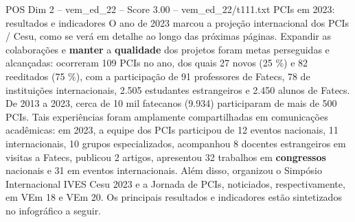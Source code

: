 \begin{textsample}{POS Dim 2 – vem\_ed\_22 – Score 3.00 – vem\_ed\_22/t111.txt}  \label{ex:f2_pos_179}
PCIs em 2023: resultados e indicadores O ano de 2023 marcou a projeção internacional dos PCIs / Cesu, como se verá em detalhe ao longo das próximas páginas.
Expandir as colaborações e \textbf{manter} a \textbf{qualidade} dos projetos foram metas perseguidas e alcançadas: ocorreram 109 PCIs no ano, dos quais 27 novos (25 \%) e 82 reeditados (75 \%), com a participação de 91 professores de Fatecs, 78 de instituições internacionais, 2.505 estudantes estrangeiros e 2.450 alunos de Fatecs.
De 2013 a 2023, cerca de 10 mil fatecanos (9.934) participaram de mais de 500 PCIs.
Tais experiências foram amplamente compartilhadas em comunicações acadêmicas: em 2023, a equipe dos PCIs participou de 12 eventos nacionais, 11 internacionais, 10 grupos especializados, acompanhou 8 docentes estrangeiros em visitas a Fatecs, publicou 2 artigos, apresentou 32 trabalhos em \textbf{congressos} nacionais e 31 em eventos internacionais.
Além disso, organizou o Simpósio Internacional IVES Cesu 2023 e a Jornada de PCIs, noticiados, respectivamente, em VEm 18 e VEm 20.
Os principais resultados e indicadores estão sintetizados no infográfico a seguir.

\end{textsample}
